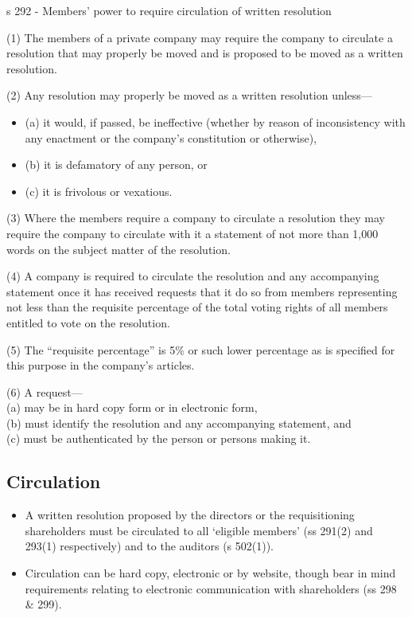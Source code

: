 \documentclass[
]{article}
\providecommand{\tightlist}{%
  \setlength{\itemsep}{0pt}\setlength{\parskip}{0pt}}
\newenvironment{env-12fb5320-b8eb-47b6-8035-097e16242c42}
{
    \savenotes\tcolorbox[blanker,breakable,left=5pt,borderline west={2pt}{-4pt}{green}]
}
{
    \endtcolorbox\spewnotes
}
\begin{document}
\begin{env-12fb5320-b8eb-47b6-8035-097e16242c42}

s 292 - Members' power to require circulation of written resolution

(1) The members of a private company may require the company to
circulate a resolution that may properly be moved and is proposed to be
moved as a written resolution.

(2) Any resolution may properly be moved as a written resolution
unless---

\begin{itemize}
\tightlist
\item
  (a) it would, if passed, be ineffective (whether by reason of
  inconsistency with any enactment or the company's constitution or
  otherwise),
\item
  (b) it is defamatory of any person, or
\item
  (c) it is frivolous or vexatious.
\end{itemize}

(3) Where the members require a company to circulate a resolution they
may require the company to circulate with it a statement of not more
than 1,000 words on the subject matter of the resolution.

(4) A company is required to circulate the resolution and any
accompanying statement once it has received requests that it do so from
members representing not less than the requisite percentage of the total
voting rights of all members entitled to vote on the resolution.

(5) The ``requisite percentage'' is 5\% or such lower percentage as is
specified for this purpose in the company's articles.

(6) A request---\\
(a) may be in hard copy form or in electronic form,\\
(b) must identify the resolution and any accompanying statement, and\\
(c) must be authenticated by the person or persons making it.

\end{env-12fb5320-b8eb-47b6-8035-097e16242c42}

\hypertarget{circulation}{%
\subsection{Circulation}\label{circulation}}

\begin{itemize}
\tightlist
\item
  A written resolution proposed by the directors or the requisitioning
  shareholders must be circulated to all `eligible members' (ss 291(2)
  and 293(1) respectively) and to the auditors (s 502(1)).
\item
  Circulation can be hard copy, electronic or by website, though bear in
  mind requirements relating to electronic communication with
  shareholders (ss 298 \& 299).
\end{itemize}
\end{document}

